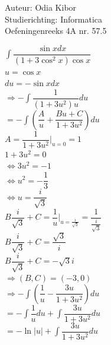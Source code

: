 \documentclass[a4paper]{article}
\begin{document}
  
\noindent \large Auteur: Odia Kibor \\
\noindent \large Studierichting: Informatica\\
\noindent \large Oefeningenreeks 4A nr. 57.5
\\

\medskip

\normalsize


$ \displaystyle\int \dfrac{\sin x dx}{(1 + 3\cos^2 x)\cos x} $\\

$u =\cos x$\\

$du = -\sin x dx$\\

$\Rightarrow - \displaystyle\int \dfrac{1}{(1 + 3u^2)u}du$\\

$= -\displaystyle\int \left(\dfrac{A}{u} + \dfrac{Bu + C}{1 + 3u^2}\right)du$\\
 
$ A =\dfrac{1}{1 + 3u^2}\bigg|_{u = 0} = 1 $\\

$1 + 3u^2 = 0$\\

$\Leftrightarrow 3u^2 = -1$\\

$\Leftrightarrow u^2 = -\dfrac{1}{3}$\\

$\Leftrightarrow u = \dfrac{i}{\sqrt{3}}$\\

$B\dfrac{i}{\sqrt{3}} + C =\dfrac{1}{u}\bigg|_{u = \frac{i}{\sqrt{3}}} = \dfrac{1}{\frac{i}{\sqrt{3}}}$\\

$B\dfrac{i}{\sqrt{3}} + C = \dfrac{\sqrt{3}}{i}$\\

$B\dfrac{i}{\sqrt{3}} + C = -\sqrt{3}i$\\

$\Rightarrow (B, C) = (-3, 0)$\\

$\Rightarrow -\displaystyle\int \left(\dfrac{1}{u} - \dfrac{3u}{1 + 3u^2}\right)du$\\

$= -\displaystyle\int \dfrac{1}{u}du + \displaystyle\int \dfrac{3u}{1 + 3u^2}du$\\

$= - \ln |u| + \displaystyle\int \dfrac{3u}{1 + 3u^2}du$\\
\end{document}
